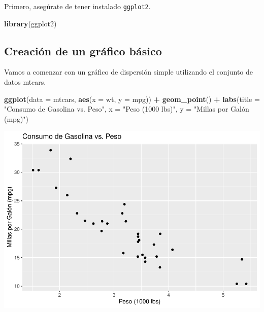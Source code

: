 \documentclass[
]{book}
\newenvironment{Shaded}{\begin{snugshade}}{\end{snugshade}}
\newcommand{\AttributeTok}[1]{\textcolor[rgb]{0.13,0.29,0.53}{#1}}
\newcommand{\FunctionTok}[1]{\textcolor[rgb]{0.13,0.29,0.53}{\textbf{#1}}}
\newcommand{\NormalTok}[1]{#1}
\newcommand{\SpecialCharTok}[1]{\textcolor[rgb]{0.81,0.36,0.00}{\textbf{#1}}}
\newcommand{\StringTok}[1]{\textcolor[rgb]{0.31,0.60,0.02}{#1}}
\begin{document}
Primero, asegúrate de tener instalado \texttt{ggplot2}.

\begin{Shaded}
\begin{Highlighting}[]
\FunctionTok{library}\NormalTok{(ggplot2)}
\end{Highlighting}
\end{Shaded}

\subsection{Creación de un gráfico básico}\label{creaciuxf3n-de-un-gruxe1fico-buxe1sico}

Vamos a comenzar con un gráfico de dispersión simple utilizando el conjunto de datos mtcars.

\begin{Shaded}
\begin{Highlighting}[]
\FunctionTok{ggplot}\NormalTok{(}\AttributeTok{data =}\NormalTok{ mtcars, }\FunctionTok{aes}\NormalTok{(}\AttributeTok{x =}\NormalTok{ wt, }\AttributeTok{y =}\NormalTok{ mpg)) }\SpecialCharTok{+} 
  \FunctionTok{geom\_point}\NormalTok{() }\SpecialCharTok{+}
  \FunctionTok{labs}\NormalTok{(}\AttributeTok{title =} \StringTok{"Consumo de Gasolina vs. Peso"}\NormalTok{,}
       \AttributeTok{x =} \StringTok{"Peso (1000 lbs)"}\NormalTok{,}
       \AttributeTok{y =} \StringTok{"Millas por Galón (mpg)"}\NormalTok{)}
\end{Highlighting}
\end{Shaded}

\includegraphics{bookdown-demo_files/figure-latex/unnamed-chunk-174-1.pdf}
\end{document}
